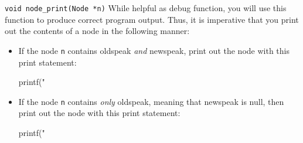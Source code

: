 \begin{funcdoc}{\texttt{void node\_print(Node *n)}}
  While helpful as debug function, you will use this function to produce
  correct program output. Thus, it is imperative that you print out the
  contents of a node in the following manner:

  \begin{itemize}
    \item If the node \texttt{n} contains oldspeak \emph{and} newspeak,
      print out the node with this print statement:
      \begin{clisting}{}
printf("%
      \end{clisting}
    \item If the node \texttt{n} contains \emph{only} oldspeak, meaning
      that newspeak is null, then print out the node with this print
      statement:
      \begin{clisting}{}
printf("%
      \end{clisting}
  \end{itemize}
\end{funcdoc}

